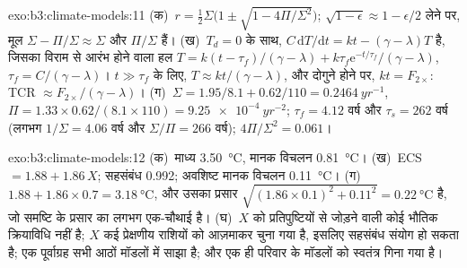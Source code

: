 \begin{solution}{exo:b3:climate-models:11}
(क)~$r = \tfrac12\Sigma\big(1 \pm \sqrt{1 - 4\Pi/\Sigma^2}\big)$;
$\sqrt{1 - \epsilon} \approx 1 - \epsilon/2$ लेने पर, मूल $\Sigma -
\Pi/\Sigma \approx \Sigma$ और $\Pi/\Sigma$ हैं। (ख)~$T_d = 0$ के साथ, $C\,\mathrm
dT/\mathrm dt = kt - (\gamma - \lambda)T$ है, जिसका विराम से आरंभ होने वाला हल $T =
k(t - \tau_f)/(\gamma - \lambda) + k\tau_f\mathrm e^{-t/\tau_f}/(\gamma -
\lambda)$, $\tau_f = C/(\gamma - \lambda)$। $t \gg \tau_f$ के लिए, $T \approx
kt/(\gamma - \lambda)$, और दोगुने होने पर, $kt = F_{2\times}$: TCR
$\approx F_{2\times}/(\gamma - \lambda)$। (ग)~$\Sigma = 1.95/8.1 +
0.62/110 = \qty{0.2464}{yr^{-1}}$, $\Pi = 1.33\times0.62/(8.1\times110) =
\qty{9.25e-4}{yr^{-2}}$; $\tau_f = \num{4.12}\text{ वर्ष}$ और $\tau_s =
\num{262}\text{ वर्ष}$ (लगभग $1/\Sigma = \num{4.06}\text{ वर्ष}$ और
$\Sigma/\Pi = \num{266}\text{ वर्ष}$); $4\Pi/\Sigma^2 = 0.061$।
\end{solution}

\begin{solution}{exo:b3:climate-models:12}
(क)~माध्य \qty{3.50}{\celsius}, मानक विचलन \qty{0.81}{\celsius}।
(ख)~ECS $= 1.88 + 1.86\,X$; सहसंबंध \num{0.992}; अवशिष्ट मानक
विचलन \qty{0.11}{\celsius}। (ग)~$1.88 + 1.86\times0.7 =
\qty{3.18}{\celsius}$, और उसका प्रसार $\sqrt{(1.86\times0.1)^2 + 0.11^2} =
\qty{0.22}{\celsius}$ है, जो समष्टि के प्रसार का लगभग एक-चौथाई है।
(घ)~$X$ को प्रतिपुष्टियों से जोड़ने वाली कोई भौतिक क्रियाविधि नहीं है; $X$ कई प्रेक्षणीय
राशियों को आज़माकर चुना गया है, इसलिए सहसंबंध संयोग हो सकता है; एक पूर्वाग्रह
सभी आठों मॉडलों में साझा है; और एक ही परिवार के मॉडलों को
स्वतंत्र गिना गया है।
\end{solution}

